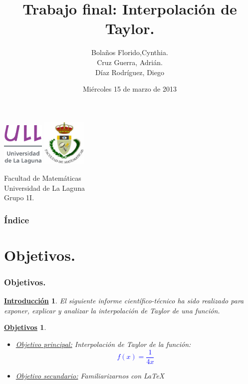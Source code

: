 \documentclass{beamer}
\title[Presentación con Beamer]{Trabajo final: Interpolación de Taylor.}
\author[Técnicas Experimentales]{Bolaños Florido,Cynthia. \\
Cruz Guerra, Adrián.\\
Díaz Rodríguez, Diego}
\date[15-05-2013]{Miércoles 15 de marzo de 2013}
\newtheorem{descripcion de los experimentos}{\underline {Descripcion de los experimentos}}
\newtheorem{introduccion}{\underline {Introducci\'{o}n}}
\newtheorem{objetivos}{\underline {Objetivos}}
\begin{document}
\begin{frame}

\includegraphics[width=0.15\textwidth]{img/ullesc.eps}
\hspace*{7.5cm}
\includegraphics[width=0.16\textwidth]{img/fmatesc.eps}
\titlepage

  \begin{scriptsize}
    \begin{center}
     Facultad de Matemáticas \\
     Universidad de La Laguna \\
     Grupo 1I.
    \end{center}
  \end{scriptsize}
\end{frame}


\begin{frame}
  \frametitle{Índice}
  \tableofcontents[pausesections]
\end{frame}


\section{Objetivos.}
\begin{frame}
\frametitle{Objetivos.}
\begin{introduccion}
El siguiente informe científico-técnico ha sido realizado para exponer, explicar y analizar la interpolación de Taylor de una función.
\pause
\end{introduccion}
\begin{objetivos}
\pause
\begin {itemize}
\item \underline {Objetivo principal:} Interpolación  de Taylor de la  función:
\textcolor{blue}{$$f(x)= \frac{1}{4x}$$}
\item \underline {Objetivo secundario:} Familiarizarnos con LaTeX
\end {itemize}
\end{objetivos}
\end{frame}
\end{document}
